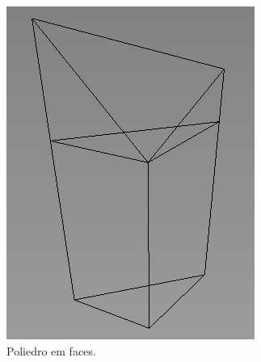 \begin{figure}[H]
    \centering
    \begin{subfigure}[t]{0.3\textwidth}
        \includegraphics[width=\textwidth]{dados/figuras/pol_line.png}
        \caption{Poliedro em faces.}
        \label{fig:polyhedron1}
    \end{subfigure}
    \hspace{1em}
    \begin{subfigure}[t]{0.3\textwidth}

\end{subfigure}
\end{figure}
